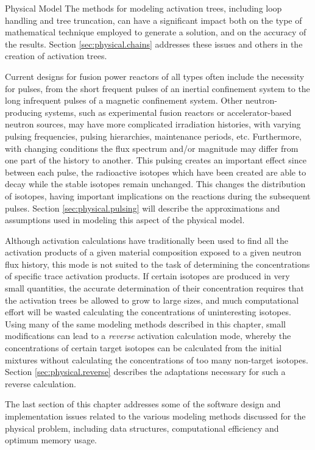 \begin{chapter}{Physical Model\label{chap:physical}}
The methods for modeling activation trees, including loop handling and
tree truncation, can have a significant impact both on the type of
mathematical technique employed to generate a solution, and on the
accuracy of the results.  Section \ref{sec:physical.chains} addresses
these issues and others in the creation of activation trees.

Current designs for fusion power reactors of all types often include
the necessity for pulses, from the short frequent pulses of an
inertial confinement system to the long infrequent pulses of a
magnetic confinement system.  Other neutron-producing systems, such as
experimental fusion reactors or accelerator-based neutron sources, may
have more complicated irradiation histories, with varying pulsing
frequencies, pulsing hierarchies, maintenance periods, etc.
Furthermore, with changing conditions the flux spectrum and/or
magnitude may differ from one part of the history to another.  This
pulsing creates an important effect\cite{Pulsar,spangler,spanglerMS}
since between each pulse, the radioactive isotopes which have been
created are able to decay while the stable isotopes remain unchanged.
This changes the distribution of isotopes, having important
implications on the reactions during the subsequent pulses.  Section
\ref{sec:physical.pulsing} will describe the approximations and
assumptions used in modeling this aspect of the physical model.

Although activation calculations have traditionally been used to find
all the activation products of a given material composition exposed to
a given neutron flux history, this mode is not suited to the task of
determining the concentrations of specific trace activation products.
If certain isotopes are produced in very small quantities, the
accurate determination of their concentration requires that the
activation trees be allowed to grow to large sizes, and much
computational effort will be wasted calculating the concentrations of
uninteresting isotopes.  Using many of the same modeling methods
described in this chapter, small modifications can lead to a
\textsl{reverse} activation calculation mode, whereby the
concentrations of certain target isotopes can be calculated from the
initial mixtures without calculating the concentrations of too many
non-target isotopes.  Section \ref{sec:physical.reverse} describes the
adaptations necessary for such a reverse calculation.

The last section of this chapter addresses some of the software design
and implementation issues related to the various modeling methods
discussed for the physical problem, including data structures,
computational efficiency and optimum memory usage.


\end{chapter}
